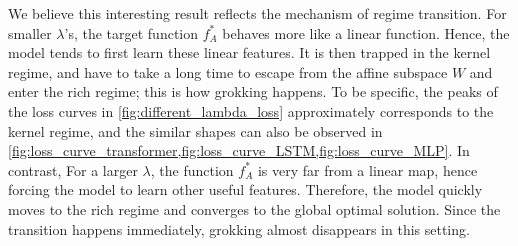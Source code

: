 We believe this interesting result reflects the mechanism of regime transition.
For smaller $\lambda$'s, the target function $f_A^*$ behaves more like a linear function.
Hence, the model tends to first learn these linear features.
It is then trapped in the kernel regime, and have to take a long time to escape from the affine subspace $W$ and enter the rich regime;
this is how grokking happens.
To be specific, the peaks of the loss curves in \cref{fig:different_lambda_loss} approximately corresponds to the kernel regime, and the similar shapes can also be observed in \cref{fig:loss_curve_transformer,fig:loss_curve_LSTM,fig:loss_curve_MLP}.
In contrast, For a larger $\lambda$, the function $f_A^*$ is very far from a linear map, hence forcing the model to learn other useful features.
Therefore, the model quickly moves to the rich regime and converges to the global optimal solution.
Since the transition happens immediately, grokking almost disappears in this setting.